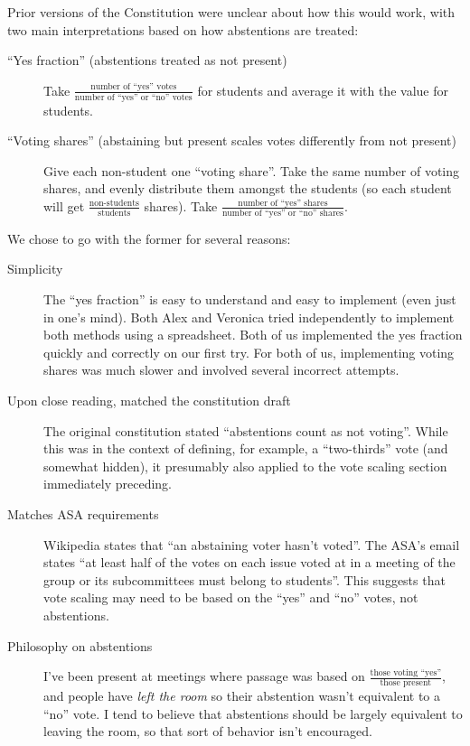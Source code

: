 \documentclass{article}
\begin{document}
Prior versions of the Constitution were unclear about how this would work, with two main interpretations based on how abstentions are treated:
\begin{description}
\item[``Yes fraction'' (abstentions treated as not present)] Take $\frac{\mbox{number of ``yes'' votes}}{\mbox{number of ``yes'' or ``no'' votes}}$ for students and average it with the value for students.
\item[``Voting shares'' (abstaining but present scales votes differently from not present)] Give each non-student one ``voting share''. Take the same number of voting shares, and evenly distribute them amongst the students (so each student will get $\frac{\mbox{non-students}}{\mbox{students}}$ shares). Take $\frac{\mbox{number of ``yes'' shares}}{\mbox{number of ``yes'' or ``no'' shares}}$.
\end{description}

We chose to go with the former for several reasons:
\begin{description}
\item[Simplicity] The ``yes fraction'' is easy to understand and easy to implement (even just in one's mind). Both Alex and Veronica tried independently to implement both methods using a spreadsheet. Both of us implemented the yes fraction quickly and correctly on our first try. For both of us, implementing voting shares was much slower and involved several incorrect attempts.
\item[Upon close reading, matched the constitution draft] The original constitution stated ``abstentions count as not voting''. While this was in the context of defining, for example, a ``two-thirds'' vote (and somewhat hidden), it presumably also applied to the vote scaling section immediately preceding.
\item[Matches ASA requirements] Wikipedia states that ``an abstaining voter hasn't voted''. The ASA's email states ``at least half of the votes on each issue voted at in a meeting of the group or its subcommittees must belong to students''. This suggests that vote scaling may need to be based on the ``yes'' and ``no'' votes, not abstentions.
\item[Philosophy on abstentions] I've been present at meetings where passage was based on $\frac{\mbox{those voting ``yes''}}{\mbox{those present}}$, and people have \emph{left the room} so their abstention wasn't equivalent to a ``no'' vote. I tend to believe that abstentions should be largely equivalent to leaving the room, so that sort of behavior isn't encouraged.
\end{description}
\end{document}
